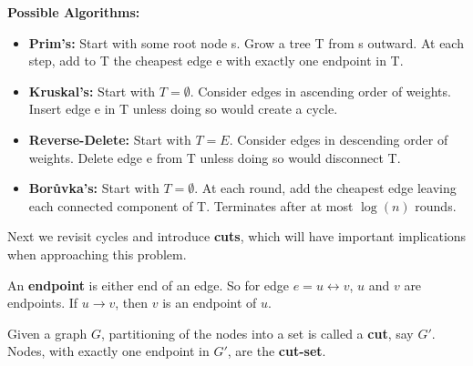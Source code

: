 \noindent
\textbf{Possible Algorithms:}
\begin{itemize}
    \item \textbf{Prim's:} Start with some root node s. Grow a tree T from s outward. At each step, add to T the cheapest edge e with exactly one endpoint in T.
    \item \textbf{Kruskal's:} Start with \( T = \emptyset \). Consider edges in ascending order of weights. Insert edge e in T unless doing so would create a cycle.
    \item \textbf{Reverse-Delete:} Start with \( T = E \). Consider edges in descending order of weights. Delete edge e from T unless doing so would disconnect T.
    \item \textbf{Borůvka's:} Start with \( T = \emptyset \). At each round, add the cheapest edge leaving each connected component of T. Terminates after at most \( \log(n) \) rounds.
\end{itemize}

\noindent
Next we revisit cycles and introduce \textbf{cuts}, which will have important implications when approaching this problem.

\newpage

\begin{Def}[Endpoint]
    
        An \textbf{endpoint} is either end of an edge. So for edge $e = u\leftrightarrow v$, $u$ and $v$ are endpoints. If
        $u\to v$, then $v$ is an endpoint of $u$.
\end{Def}
\begin{Def}[Cut]

    Given a graph $G$, partitioning of the nodes into a set is called a \textbf{cut}, say $G'$. Nodes, with exactly one endpoint in $G'$, are the \textbf{cut-set}.
    
\end{Def}



